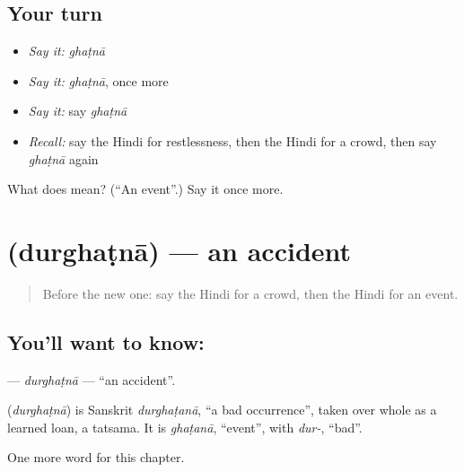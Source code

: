 \subsection*{Your turn}
\begin{itemize}
\raggedright
  \item \emph{Say it:} \emph{ghaṭnā}
  \item \emph{Say it:} \emph{ghaṭnā}, once more
  \item \emph{Say it:} say \emph{ghaṭnā}
  \item \emph{Recall:} say the Hindi for restlessness, then the Hindi for a crowd, then say \emph{ghaṭnā} again
\end{itemize}

\begin{tcolorbox}[breakable,colback=teal!4,colframe=teal!35!black,title={Before you move on}]
What does  mean? (\textquotedblleft{}An event\textquotedblright{}.) Say it once more.
\end{tcolorbox}
\section[\texorpdfstring{\hi{दुर्घटना} (durghaṭnā)}{दुर्घटना (durghaṭnā)}]{ (durghaṭnā) — an accident}

\label{lesson:HI-C259-durghatna}



\begin{quote}
Before the new one: say the Hindi for a crowd, then the Hindi for an event.
\end{quote}

\subsection*{You'll want to know: }
\textbf{} — \emph{durghaṭnā} — \textquotedblleft{}an accident\textquotedblright{}.

\begin{cousinweb}
\textbf{} (\emph{durghaṭnā}) is Sanskrit \emph{durghaṭanā}, \textquotedblleft{}a bad occurrence\textquotedblright{}, taken over whole as a learned loan, a tatsama. It is \emph{ghaṭanā}, \textquotedblleft{}event\textquotedblright{}, with \emph{dur-}, \textquotedblleft{}bad\textquotedblright{}.
\end{cousinweb}

\begin{grammarlens}[title={What you've built}]
One more word for this chapter.
\end{grammarlens}

